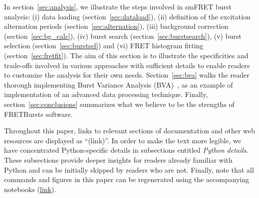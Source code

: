 In section~\ref{sec:analysis}, we illustrate the steps involved
in smFRET burst analysis: (i) data loading (section~\ref{sec:dataload}), 
(ii) definition of the excitation alternation periods 
(section~\ref{sec:alternation}), (iii) background correction 
(section~\ref{sec:bg_calc}), (iv) burst search 
(section~\ref{sec:burstsearch}),
(v) burst selection (section~\ref{sec:burstsel}) and 
(vi) FRET histogram fitting (section~\ref{sec:fretfit}).
The aim of this section is to illustrate the specificities and 
trade-offs involved in various approaches
with sufficient details to enable readers 
to customize the analysis for their own needs.
Section~\ref{sec:bva} walks the reader thorough implementing
Burst Variance Analysis (BVA)~\cite{Torella_2011}, as an example 
of implementation of an advanced data processing technique.
Finally, section~\ref{sec:conclusions} summarizes what we believe 
to be the strengths of FRETBursts software.

Throughout this paper,
links to relevant sections of documentation and other web resources
are displayed as ``(link)''.
In order to make the text more legible,
we have concentrated Python-specific details in subsections entitled
\textit{Python details}. These subsections provide deeper insights for readers
already familiar with Python and can be initially skipped by readers who are not.
Finally, note that all commands and figures in this paper can be regenerated 
using the accompanying notebooks
(\href{https://github.com/tritemio/fretbursts_paper}{link}).
